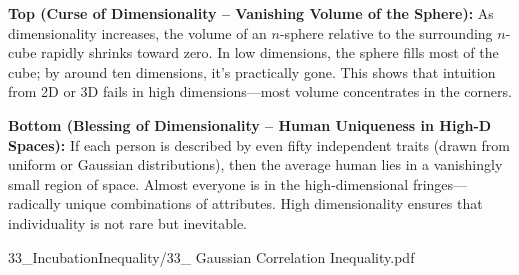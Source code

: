 \begin{SideNotePage}{
  \textbf{Top (Curse of Dimensionality – Vanishing Volume of the Sphere):}  
  As dimensionality increases, the volume of an $n$-sphere relative to the surrounding $n$-cube rapidly shrinks toward zero. In low dimensions, the sphere fills most of the cube; by around ten dimensions, it's practically gone. This shows that intuition from 2D or 3D fails in high dimensions—most volume concentrates in the corners. \par

  \textbf{Bottom (Blessing of Dimensionality – Human Uniqueness in High-D Spaces):}  
  If each person is described by even fifty independent traits (drawn from uniform or Gaussian distributions), then the \QSOpen{}average\QSClose{} human lies in a vanishingly small region of space. Almost everyone is in the high-dimensional fringes—radically unique combinations of attributes. High dimensionality ensures that individuality is not rare but inevitable. \par
}{33_IncubationInequality/33_ Gaussian Correlation Inequality.pdf}
\end{SideNotePage}
